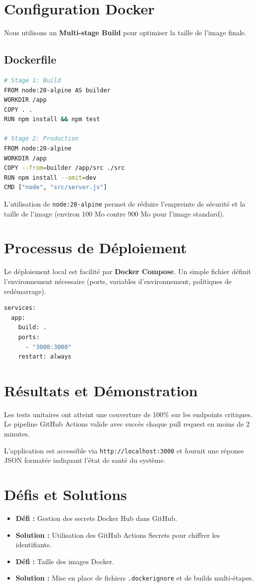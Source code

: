 \documentclass[12pt,a4paper]{report}
\begin{document}
\chapter{Configuration Docker}
Nous utilisons un \textbf{Multi-stage Build} pour optimiser la taille de l'image finale.

\section{Dockerfile}
\begin{lstlisting}[language=bash, caption=Configuration Dockerfile]
# Stage 1: Build
FROM node:20-alpine AS builder
WORKDIR /app
COPY . .
RUN npm install && npm test

# Stage 2: Production
FROM node:20-alpine
WORKDIR /app
COPY --from=builder /app/src ./src
RUN npm install --omit=dev
CMD ["node", "src/server.js"]
\end{lstlisting}

L'utilisation de \texttt{node:20-alpine} permet de réduire l'empreinte de sécurité et la taille de l'image (environ 100 Mo contre 900 Mo pour l'image standard).

\chapter{Processus de Déploiement}
Le déploiement local est facilité par \textbf{Docker Compose}. Un simple fichier définit l'environnement nécessaire (ports, variables d'environnement, politiques de redémarrage).

\begin{lstlisting}[language=bash, caption=Fichier docker-compose.yml]
services:
  app:
    build: .
    ports:
      - "3000:3000"
    restart: always
\end{lstlisting}

\chapter{Résultats et Démonstration}
Les tests unitaires ont atteint une couverture de 100\% sur les endpoints critiques. Le pipeline GitHub Actions valide avec succès chaque pull request en moins de 2 minutes.

L'application est accessible via \texttt{http://localhost:3000} et fournit une réponse JSON formatée indiquant l'état de santé du système.

\chapter{Défis et Solutions}
\begin{itemize}
    \item \textbf{Défi :} Gestion des secrets Docker Hub dans GitHub.
    \item \textbf{Solution :} Utilisation des GitHub Actions Secrets pour chiffrer les identifiants.
    \item \textbf{Défi :} Taille des images Docker.
    \item \textbf{Solution :} Mise en place de fichiers \texttt{.dockerignore} et de builds multi-étapes.
\end{itemize}
\end{document}
